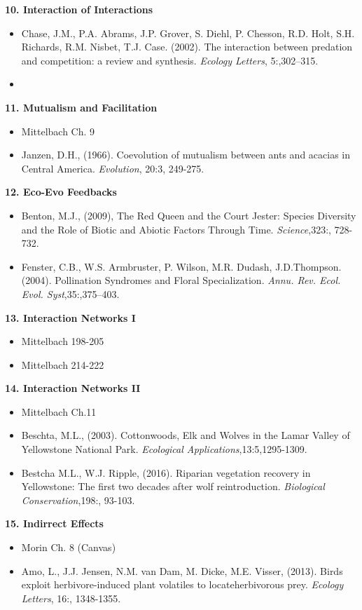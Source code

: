 \documentclass{article}
\begin{document}
\hline
\textbf{10. Interaction of Interactions }
\begin{itemize}
\item Chase, J.M., P.A. Abrams, J.P. Grover, S. Diehl, P. Chesson, R.D. Holt, S.H. Richards, R.M. Nisbet, T.J. Case. (2002). The interaction between predation and competition: a review and synthesis. \textit{Ecology Letters}, 5:,302–315.
\item 
\end{itemize}
\hline
\textbf{11. Mutualism and Facilitation}
\begin{itemize}
\item Mittelbach Ch. 9
\item Janzen, D.H., (1966). Coevolution of mutualism between ants and acacias in Central America. \textit{Evolution}, 20:3, 249-275.
\end{itemize}
\hline
\textbf{12. Eco-Evo Feedbacks}
\begin{itemize}
\item Benton, M.J., (2009), The Red Queen and the Court Jester: Species Diversity and the Role of Biotic and Abiotic Factors Through Time. \textit{Science},323:, 728-732.
\item Fenster, C.B., W.S. Armbruster, P. Wilson, M.R. Dudash, J.D.Thompson. (2004). Pollination Syndromes and Floral Specialization. \textit{Annu. Rev. Ecol. Evol. Syst},35:,375–403.
\end{itemize}
\hline
\textbf{13. Interaction Networks I}
\begin{itemize}
\item Mittelbach 198-205
\item Mittelbach 214-222
\end{itemize}
\hline
\textbf{14. Interaction Networks II}
\begin{itemize}
\item Mittelbach Ch.11
\item Beschta, M.L., (2003). Cottonwoods, Elk and Wolves in the Lamar Valley of Yellowstone National Park. \textit{Ecological Applications},13:5,1295-1309.
\item Bestcha M.L., W.J. Ripple, (2016). Riparian vegetation recovery in Yellowstone: The first two decades after wolf reintroduction. \textit{Biological Conservation},198:, 93-103.
\end{itemize}
\hline
\textbf{15. Indirrect Effects}
\begin{itemize}
\item Morin Ch. 8 (Canvas)
\item Amo, L., J.J. Jensen, N.M. van Dam, M. Dicke, M.E. Visser, (2013). Birds exploit herbivore-induced plant volatiles to locateherbivorous prey. \textit{Ecology Letters}, 16:, 1348-1355.
\end{itemize}
\end{document}

